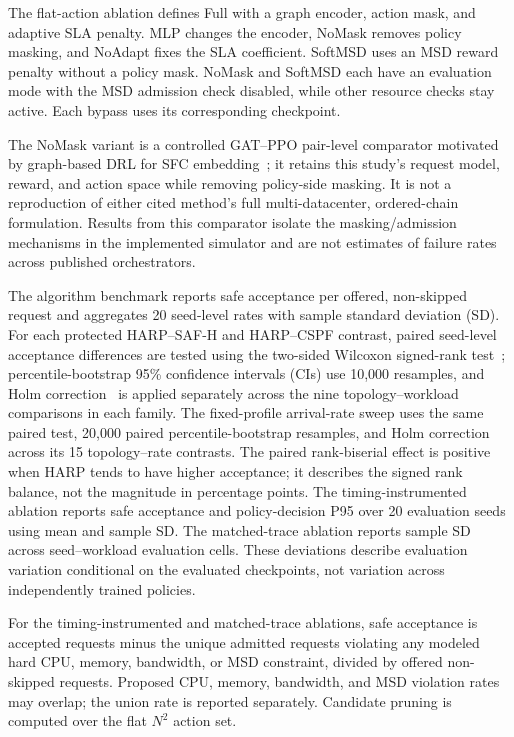 \documentclass[final,5p]{elsarticle}
\newcommand{\rev}[1]{\textcolor{revisiongreen}{#1}}
\let\newrev\rev
\begin{document}
\newrev{The flat-action ablation defines Full with a graph encoder, action mask, and adaptive SLA penalty. MLP changes the encoder, NoMask removes policy masking, and NoAdapt fixes the SLA coefficient. SoftMSD uses an MSD reward penalty without a policy mask. NoMask and SoftMSD each have an evaluation mode with the MSD admission check disabled, while other resource checks stay active. Each bypass uses its corresponding checkpoint.}

\newrev{The NoMask variant is a controlled GAT--PPO pair-level comparator motivated by graph-based DRL for SFC embedding~\cite{xiao2023twostage,liu2024sfcml}; it retains this study's request model, reward, and action space while removing policy-side masking. It is not a reproduction of either cited method's full multi-datacenter, ordered-chain formulation. Results from this comparator isolate the masking/admission mechanisms in the implemented simulator and are not estimates of failure rates across published orchestrators.}

\newrev{The algorithm benchmark reports safe acceptance per offered, non-skipped request and aggregates 20 seed-level rates with sample standard deviation (SD). For each protected HARP--SAF-H and HARP--CSPF contrast, paired seed-level acceptance differences are tested using the two-sided Wilcoxon signed-rank test~\cite{wilcoxon1945}; percentile-bootstrap 95\% confidence intervals (CIs) use 10,000 resamples, and Holm correction~\cite{holm1979} is applied separately across the nine topology--workload comparisons in each family. The fixed-profile arrival-rate sweep uses the same paired test, 20,000 paired percentile-bootstrap resamples, and Holm correction across its 15 topology--rate contrasts. The paired rank-biserial effect is positive when HARP tends to have higher acceptance; it describes the signed rank balance, not the magnitude in percentage points. The timing-instrumented ablation reports safe acceptance and policy-decision P95 over 20 evaluation seeds using mean and sample SD. The matched-trace ablation reports sample SD across seed--workload evaluation cells. These deviations describe evaluation variation conditional on the evaluated checkpoints, not variation across independently trained policies.}

\newrev{For the timing-instrumented and matched-trace ablations, safe acceptance is accepted requests minus the unique admitted requests violating any modeled hard CPU, memory, bandwidth, or MSD constraint, divided by offered non-skipped requests. Proposed CPU, memory, bandwidth, and MSD violation rates may overlap; the union rate is reported separately. Candidate pruning is computed over the flat $N^2$ action set.}
\end{document}

